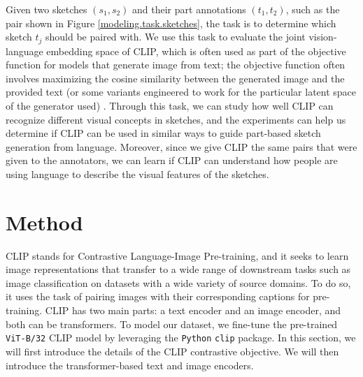 Given two sketches $(s_1,s_2)$ and their part annotations $(t_1,t_2)$, such as the pair shown in Figure \ref{modeling.task.sketches}, the task is to determine which sketch $t_j$ should be paired with.
We use this task to evaluate the joint vision-language embedding space of CLIP, which is often used as part of the objective function for models that generate image from text; the objective function often involves maximizing the cosine similarity between the generated image and the provided text (or some variants engineered to work for the particular latent space of the generator used) \citep{clipDrawPaper,styleCLIPPaper,styleganNadaPaper,dalle2Paper}. 
Through this task, we can study how well CLIP can recognize different visual concepts in sketches, and the experiments can help us determine if CLIP can be used in similar ways to guide part-based sketch generation from language. Moreover, since we give CLIP the same pairs that were given to the annotators, we can learn if CLIP can understand how people are using language to describe the visual features of the sketches.   

\section{Method}
CLIP stands for Contrastive Language-Image Pre-training, and it seeks to learn image representations that transfer to a wide range of downstream tasks such as image classification on datasets with a wide variety of source domains. To do so, it uses the task of pairing images with their corresponding captions for pre-training.   
CLIP has two main parts: a text encoder and an image encoder, and both can be transformers. 
To model our dataset, we fine-tune the pre-trained \texttt{ViT-B/32} CLIP model by leveraging the \texttt{Python} \texttt{clip} package. 
In this section, we will first introduce the details of the CLIP contrastive objective. We will then introduce the transformer-based text and image encoders. 

